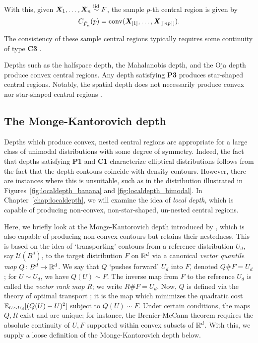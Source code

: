 With this, given $\bm{X}_1, \dots, \bm{X}_n \overset{\text{iid}}{\sim} F$, the sample $p$-th central
region is given by
\begin{equation}
    C_{\hat{F}_n}(p) = \operatorname{conv}(\bm{X}_{[1]}, \dots, \bm{X}_{[\lceil np \rceil]}).
\end{equation}

The consistency of these sample central regions typically requires some
continuity of type \textbf{C3} \parencite{liu-1990, donoho-gasko-1992,
he-wang-1997}.

Depths such as the halfspace depth, the Mahalanobis depth, and the Oja depth
produce convex central regions.
Any depth satisfying \textbf{P3} produces star-shaped central regions.
Notably, the spatial depth does not necessarily produce convex nor star-shaped
central regions \parencite{nagy-2017}.


\subsection{The Monge-Kantorovich depth}

Depths which produce convex, nested central regions are appropriate for a
large class of unimodal distributions with some degree of symmetry.
Indeed, the fact that depths satisfying \textbf{P1} and \textbf{C1}
characterize elliptical distributions follows from the fact that the depth
contours coincide with density contours.
However, there are instances where this is unsuitable, such as in the
distribution illustrated in Figures~\ref{fig:localdepth_banana} and
\ref{fig:localdepth_bimodal}.
In Chapter~\ref{chap:localdepth}, we will examine the idea of \emph{local
depth}, which is capable of producing non-convex, non-star-shaped, un-nested
central regions.

Here, we briefly look at the Monge-Kantorovich depth introduced by
\textcite{chernozhukov-galichon-hallin-henry-2017}, which is also capable of
producing non-convex contours but retains their nestedness.
This is based on the idea of `transporting' contours from a reference
distribution $U_d$, say $\mathcal{U}(B^d)$, to the target distribution $F$ on
$\mathbb{R}^d$ via a canonical \emph{vector quantile map} $Q\colon B^d \to \mathbb{R}^d$.
We say that $Q$ `pushes forward' $U_d$ into $F$, denoted $Q\#F = U_d$; for $U
\sim U_d$, we have $Q(U) \sim F$.
The inverse map from $F$ to the reference $U_d$ is called the \emph{vector
rank map} $R$; we write $R\#F = U_d$.
Now, $Q$ is defined via the theory of optimal transport
\parencite{villani-2003}; it is the map which minimizes the quadratic cost
$\operatorname{\mathbb{E}}_{U \sim U_d}[(Q(U) - U)^2]$ subject to $Q(U) \sim F$.
Under certain conditions, the maps $Q, R$ exist and are unique; for instance,
the Brenier-McCann theorem requires the absolute continuity of $U, F$
supported within convex subsets of $\mathbb{R}^d$.
With this, we supply a loose definition of the Monge-Kantorovich depth below.

